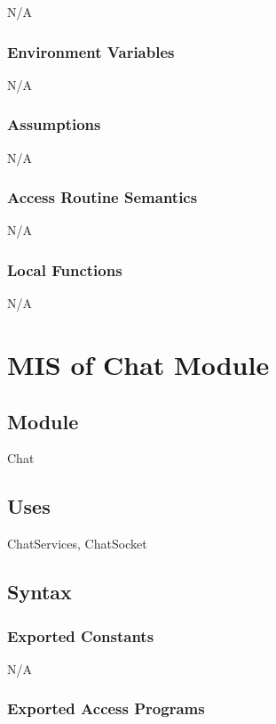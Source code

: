 \documentclass[12pt, titlepage]{article}
\begin{document}
	N/A
	
	\subsubsection{Environment Variables}
	
	N/A
	
	\subsubsection{Assumptions}
	
	N/A
	
	\subsubsection{Access Routine Semantics}
	
	N/A
	
	\subsubsection{Local Functions}
	
	N/A
	
	\newpage
	
	\section{MIS of Chat Module} \label{Module}
	
	\subsection{Module}
	
	Chat
	
	\subsection{Uses}
	
	ChatServices, ChatSocket
	
	\subsection{Syntax}
	
	\subsubsection{Exported Constants}
	
	N/A
	
	\subsubsection{Exported Access Programs}
	
\end{document}
